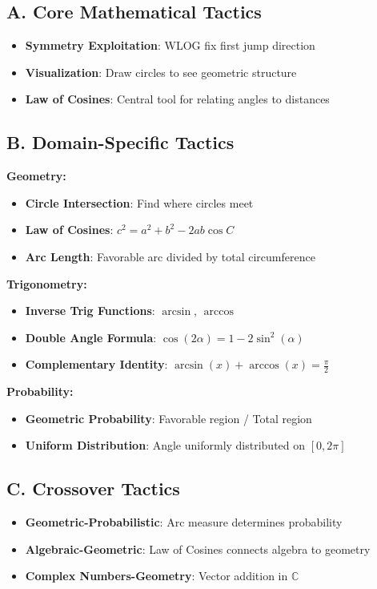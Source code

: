 \documentclass[12pt]{article}
\begin{document}
\begin{tacticalbox}
\subsection*{A. Core Mathematical Tactics}
\begin{itemize}[leftmargin=*]
    \item \textbf{Symmetry Exploitation}: WLOG fix first jump direction
    \item \textbf{Visualization}: Draw circles to see geometric structure
    \item \textbf{Law of Cosines}: Central tool for relating angles to distances
\end{itemize}

\subsection*{B. Domain-Specific Tactics}

\textbf{Geometry:}
\begin{itemize}[leftmargin=*]
    \item \textbf{Circle Intersection}: Find where circles meet
    \item \textbf{Law of Cosines}: $c^2 = a^2 + b^2 - 2ab\cos C$
    \item \textbf{Arc Length}: Favorable arc divided by total circumference
\end{itemize}

\textbf{Trigonometry:}
\begin{itemize}[leftmargin=*]
    \item \textbf{Inverse Trig Functions}: $\arcsin$, $\arccos$
    \item \textbf{Double Angle Formula}: $\cos(2\alpha) = 1 - 2\sin^2(\alpha)$
    \item \textbf{Complementary Identity}: $\arcsin(x) + \arccos(x) = \frac{\pi}{2}$
\end{itemize}

\textbf{Probability:}
\begin{itemize}[leftmargin=*]
    \item \textbf{Geometric Probability}: Favorable region / Total region
    \item \textbf{Uniform Distribution}: Angle uniformly distributed on $[0, 2\pi]$
\end{itemize}

\subsection*{C. Crossover Tactics}
\begin{itemize}[leftmargin=*]
    \item \textbf{Geometric-Probabilistic}: Arc measure determines probability
    \item \textbf{Algebraic-Geometric}: Law of Cosines connects algebra to geometry
    \item \textbf{Complex Numbers-Geometry}: Vector addition in $\mathbb{C}$
\end{itemize}
\end{tacticalbox}
\end{document}
